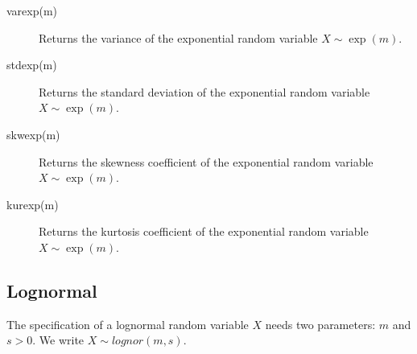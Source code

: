 \documentclass[12pt,a4paper]{article}
\begin{document}
\begin{description}
\item[varexp(m)] Returns the variance of the exponential random variable $X \sim \exp(m)$.

\item[stdexp(m)] Returns the standard deviation of the exponential random variable $X \sim \exp(m)$.

\item[skwexp(m)] Returns the skewness coefficient of the exponential random variable $X \sim \exp(m)$.

\item[kurexp(m)] Returns the kurtosis coefficient of the exponential random variable $X \sim \exp(m)$.

\end{description}

\subsection{Lognormal}

The specification of a lognormal random variable $X$ needs two parameters: $m$ and $s>0$. We write $X \sim lognor(m,s)$.
\end{document}

